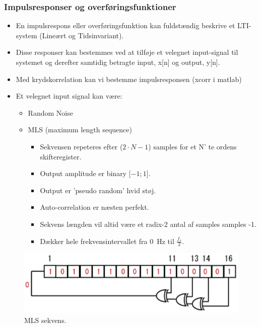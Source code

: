 \subsubsection{Impulsresponser og overføringsfunktioner}
\begin{itemize}
	\item En impulsrespons eller overføringsfunktion kan fuldstændig beskrive et LTI-system (Lineært og	Tidsinvariant).
	\item Disse responser kan bestemmes ved at tilføje et velegnet input-signal til systemet og derefter samtidig betragte input, x[n] og output, y[n].
	\item Med krydskorrelation kan vi bestemme impulsresponsen (xcorr i matlab)
	\newpage\item Et velegnet input signal kan være:
	\begin{itemize}
		\item Random Noise
		\item MLS (maximum length sequence)
		\begin{itemize}
			\item Sekvensen repeteres efter ($2\cdot N-1$) samples for et N'
			te ordens skifteregister.
			\item Output amplitude er binary [$-1; 1$].
			\item Output er 'pseudo random' hvid støj.
			\item Auto-correlation er næsten perfekt.
			\item Sekvens længden vil altid være et radix-2 antal af samples samples -1.
			\item Dækker hele frekvensintervallet fra \SI{0}{\hertz} til $\frac{f_s}{2}$.
		\end{itemize}
	\end{itemize}
\end{itemize}

\begin{figure} [H]
	\centering
	\includegraphics[width=0.6\linewidth]{graphics/45.png}
	\caption{MLS sekvens.}
	\label{fig:45}
\end{figure}

